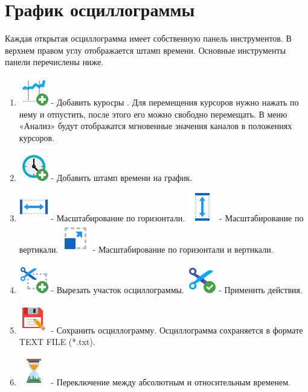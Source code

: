 \documentclass[a4paper,12pt]{article}
\begin{document}
\section*{\hspace{.5cm} График осциллограммы}
\hspace{.5cm}Каждая открытая осциллограмма имеет собственную панель инструментов. В верхнем правом углу отображается штамп времени. Основные инструменты панели перечислены ниже.
\begin{enumerate}
\item \includegraphics[width=4ex]{image/Stocks_Add.png} - Добавить куросры . Для перемещения курсоров нужно нажать по нему и отпустить, после этого его можно свободно перемещать. В меню «Анализ» будут отображатся мгновенные значения каналов в положениях курсоров. 
\item \includegraphics[width=4ex]{image/Watch_Add.png} - Добавить штамп времени на график.
\item \includegraphics[width=4ex]{image/Width-48.png} - Масштабирование по горизонтали.
        \includegraphics[width=4ex]{image/Height-48.png} - Масштабирование по вертикали. 
	  \includegraphics[width=4ex]{image/Resize-48.png} - Масштабирование по горизонтали и вертикали.
\item \includegraphics[width=4ex]{image/Cutting_Add.png} - Вырезать участок осциллограммы.
	 \includegraphics[width=4ex]{image/Cut_Apply.png} - Применить действия.
\item \includegraphics[width=4ex]{image/Save_as_48.png} - Сохранить осциллограмму. Осциллограмма сохраняется в формате TEXT FILE (*.txt). 
\item \includegraphics[width=4ex]{image/Time_abs.png} - Переключение между абсолютным и относительным временем. 
\end {enumerate}
\end{document}
